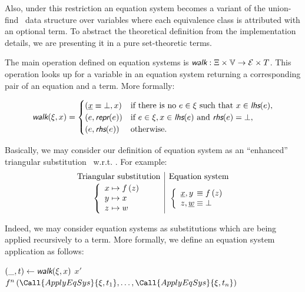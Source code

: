 Also, under this restriction an equation system becomes a variant of the union-find~\cite{arden1961algorithm} data structure over variables where each equivalence class is attributed with an optional term. To abstract the theoretical definition from the implementation details, we are presenting it in a pure set-theoretic terms.

The main operation defined on equation systems is $\walk : \Xi \times \V \rightarrow \E \times T$. This operation looks up for a variable in an equation system returning a corresponding pair of an equation and a term. More formally:

\begin{equation*}
    \walk(\xi, x) = \begin{cases}
        (\underline{x} \equiv \bot, x) & \text{if there is no $e \in \xi$ such that $x \in \lhs(e)$}, \\
        (e, \repr(e)) & \text{if $e \in \xi, x \in \lhs(e)$ and $\rhs(e) = \bot$}, \\
        (e, \rhs(e)) & \text{otherwise}. \\
    \end{cases}
\end{equation*}

Basically, we may consider our definition of equation system as an ``enhanced'' triangular substitution~\cite{baader2001unification} w.r.t. \walk. For example:
\begin{equation*}
    \begin{array}{c|c}
        \text{Triangular substitution} & \text{Equation system} \\[2pt]
        \left\{\begin{array}{l@{{}\mapsto{}}l}
            x & f\,(z) \\
            y & x \\
            z & w \\
        \end{array}\right. & \left\{\begin{array}{l@{{}\equiv{}}l}
            \underline{x}, y & f\,(z) \\
            z, \underline{w} & \bot \\
        \end{array}\right.
    \end{array}
\end{equation*}

Indeed, we may consider equation systems as substitutions which are being applied recursively to a term. More formally, we define an equation system application as follows:
\begin{algorithmic}
            \State $(\_, t) \gets \walk(\xi, x)$
        \EndIf
            \State \Return $x'$
        \EndIf
            \State \Return $f^n\,(\Call{ApplyEqSys}{\xi, t_1}, \dots, \Call{ApplyEqSys}{\xi, t_n})$
        \EndIf
    \EndFunction
\end{algorithmic}


